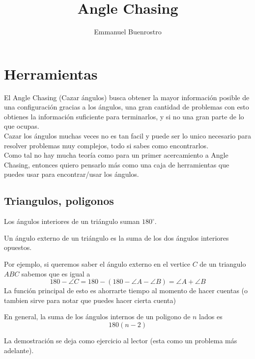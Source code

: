 \documentclass[11pt]{scrartcl}
\title {Angle Chasing}
\author{Emmanuel Buenrostro}
\begin{document}
\maketitle
\section{Herramientas}
El Angle Chasing (Cazar \'angulos) busca obtener la mayor informaci\'on posible de una configuraci\'on gracias a los \'angulos, una gran cantidad de problemas con esto obtienes la informaci\'on suficiente para terminarlos, y si no una gran parte de lo que ocupas. \\
Cazar los \'angulos muchas veces no es tan facil y puede ser lo unico necesario para resolver problemas muy complejos, todo si sabes como encontrarlos.
\\
Como tal no hay mucha teor\'ia como para un primer acercamiento a Angle Chasing, entonces quiero pensarlo m\'as como una caja de herramientas que puedes usar para encontrar/usar los \'angulos. 
\subsection{Triangulos, poligonos}
\begin{proposition}
    Los \'angulos interiores de un tri\'angulo suman $180^{\circ}$.
\end{proposition}
\begin{theorem}
    Un \'angulo externo de un tri\'angulo es la suma de los dos \'angulos interiores opuestos.
\end{theorem}
Por ejemplo, si queremos saber el \'angulo externo en el vertice $C$ de un triangulo $ABC$ sabemos que es igual a 
$$180-\angle C=180-(180-\angle A-\angle B)=\angle A+\angle B$$
La funci\'on principal de esto es ahorrarte tiempo al momento de hacer cuentas (o tambien sirve para notar que puedes hacer cierta cuenta) \\
\begin{theorem}
    En general, la suma de los \'angulos internos de un poligono de $n$ lados es 
    $$180(n-2)$$
\end{theorem}
La demostraci\'on se deja como ejercicio al lector (esta como un problema m\'as adelante).
\end{document}
